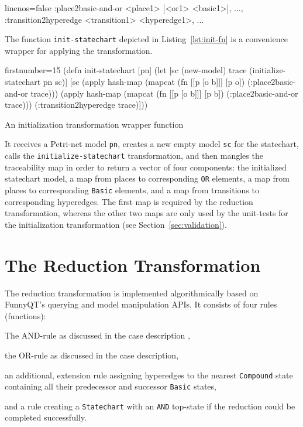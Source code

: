 \documentclass[11pt]{article}
\begin{document}
\begin{clojurecode*}{linenos=false}
{:place2basic-and-or   {<place1> [<or1> <basic1>], ...},
 :transition2hyperedge {<transition1> <hyperedge1>, ...}}
\end{clojurecode*}

The function \verb|init-statechart| depicted in Listing~\ref{lst:init-fn} is a
convenience wrapper for applying the transformation.

\begin{listing}[H]
  \begin{clojurecode*}{firstnumber=15}
(defn init-statechart [pn]
  (let [sc (new-model)
        trace (initialize-statechart pn sc)]
    [sc
     (apply hash-map (mapcat (fn [[p [o b]]] [p o])
                             (:place2basic-and-or trace)))
     (apply hash-map (mapcat (fn [[p [o b]]] [p b])
                             (:place2basic-and-or trace)))
     (:transition2hyperedge trace)]))
  \end{clojurecode*}
  \label{lst:init-fn}
  \caption{An initialization transformation wrapper function}
\end{listing}

It receives a Petri-net model \verb|pn|, creates a new empty model \verb|sc|
for the statechart, calls the \verb|initialize-statechart| transformation, and
then mangles the traceability map in order to return a vector of four
components: the initialized statechart model, a map from places to
corresponding \verb|OR| elements, a map from places to corresponding
\verb|Basic| elements, and a map from transitions to corresponding hyperedges.
The first map is required by the reduction transformation, whereas the other
two maps are only used by the unit-tests for the initialization transformation
(see Section~\ref{sec:validation}).


\section{The Reduction Transformation}
\label{sec:reduction-transformation}

The reduction transformation is implemented algorithmically based on FunnyQT's
querying and model manipulation APIs.  It consists of four rules (functions):
\begin{compactenum}
\item The AND-rule as discussed in the case description \cite{pn2sccasedesc},
\item the OR-rule as discussed in the case description,
\item an additional, extension rule assigning hyperedges to the nearest
  \verb|Compound| state containing all their predecessor and successor
  \verb|Basic| states,
\item and a rule creating a \verb|Statechart| with an \verb|AND| top-state if
  the reduction could be completed successfully.
\end{compactenum}
\end{document}
